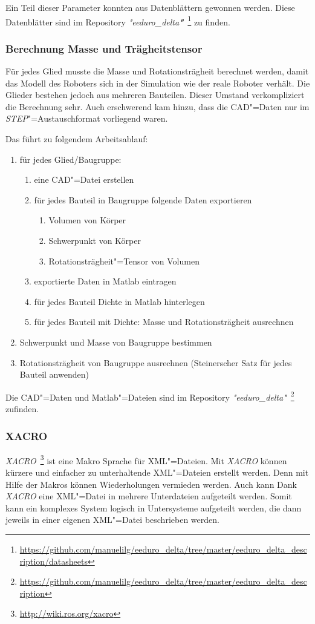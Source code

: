 Ein Teil dieser Parameter konnten aus Datenblättern gewonnen werden.
Diese Datenblätter sind im Repository \textit{\textit{"}eeduro\_delta\textbf{"}}~\footnote{\url{https://github.com/manuelilg/eeduro\_delta/tree/master/eeduro\_delta\_description/datasheets}} zu finden.

\subsubsection{Berechnung Masse und Trägheitstensor}
Für jedes Glied musste die Masse und Rotationsträgheit berechnet werden, damit das Modell des Roboters sich in der Simulation wie der reale Roboter verhält.
Die Glieder bestehen jedoch aus mehreren Bauteilen.
Dieser Umstand verkompliziert die Berechnung sehr.
Auch erschwerend kam hinzu, dass die CAD"=Daten nur im \textit{STEP}"=Austauschformat vorliegend waren.

Das führt zu folgendem Arbeitsablauf:
\begin{enumerate}
\item für jedes Glied/Baugruppe: 
\begin{enumerate}
\item eine CAD"=Datei erstellen
\item für jedes Bauteil in Baugruppe folgende Daten exportieren
\begin{enumerate}
\item Volumen von Körper
\item Schwerpunkt von Körper
\item Rotationsträgheit"=Tensor von Volumen
\end{enumerate}
\item exportierte Daten in Matlab eintragen
\item für jedes Bauteil Dichte in Matlab hinterlegen
\item für jedes Bauteil mit Dichte: Masse und Rotationsträgheit ausrechnen  
\end{enumerate}
\item Schwerpunkt und Masse von Baugruppe bestimmen
\item Rotationsträgheit von Baugruppe ausrechnen (Steinerscher Satz für jedes Bauteil anwenden)
\end{enumerate}

Die CAD"=Daten und Matlab"=Dateien sind im Repository \textit{\textit{"}eeduro\_delta\textit{"}}~\footnote{\url{https://github.com/manuelilg/eeduro_delta/tree/master/eeduro_delta_description}} zufinden.

\subsubsection{XACRO}
\label{chap:xacro}
\textit{XACRO}~\footnote{\url{http://wiki.ros.org/xacro}} ist eine Makro Sprache für XML"=Dateien.
Mit \textit{XACRO} können kürzere und einfacher zu unterhaltende XML"=Dateien erstellt werden.
Denn mit Hilfe der Makros können Wiederholungen vermieden werden.
Auch kann Dank \textit{XACRO} eine XML"=Datei in mehrere Unterdateien aufgeteilt werden.
Somit kann ein komplexes System logisch in Untersysteme aufgeteilt werden, die dann jeweils in einer eigenen XML"=Datei beschrieben werden. 




